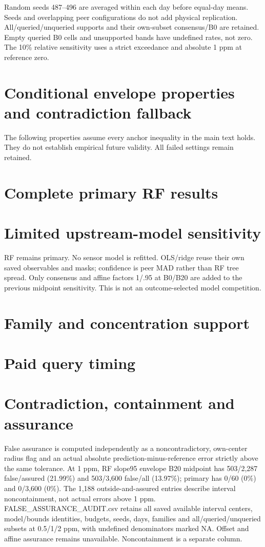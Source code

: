 \documentclass[11pt,a4paper]{article}
\newcommand{\FloatBarrier}{\par}
\begin{document}
Random seeds 487--496 are averaged within each day before equal-day means. Seeds and overlapping peer configurations do not add physical replication. All/queried/unqueried supports and their own-subset consensus/B0 are retained. Empty queried B0 cells and unsupported bands have undefined rates, not zero. The 10\% relative sensitivity uses a strict exceedance and absolute 1 ppm at reference zero.
\section{Conditional envelope properties and contradiction fallback}
The following properties assume every anchor inequality in the main text holds. They do not establish empirical future validity. All failed settings remain retained.

\section{Complete primary RF results}
\FloatBarrier
\section{Limited upstream-model sensitivity}
RF remains primary. No sensor model is refitted. OLS/ridge reuse their own saved observables and masks; confidence is peer MAD rather than RF tree spread. Only consensus and affine factors 1/.95 at B0/B20 are added to the previous midpoint sensitivity. This is not an outcome-selected model competition.
\FloatBarrier
\section{Family and concentration support}
\FloatBarrier
\section{Paid query timing}
\FloatBarrier
\section{Contradiction, containment and assurance}

False assurance is computed independently as a noncontradictory, own-center radius flag and an actual absolute prediction-minus-reference error strictly above the same tolerance. At 1 ppm, RF slope95 envelope B20 midpoint has 503/2,287 false/assured (21.99\%) and 503/3,600 false/all (13.97\%); primary has 0/60 (0\%) and 0/3,600 (0\%). The 1,188 outside-and-assured entries describe interval noncontainment, not actual errors above 1 ppm. FALSE\_ASSURANCE\_AUDIT.csv retains all saved available interval centers, model/bounds identities, budgets, seeds, days, families and all/queried/unqueried subsets at 0.5/1/2 ppm, with undefined denominators marked NA. Offset and affine assurance remains unavailable. Noncontainment is a separate column.
\FloatBarrier
\end{document}
